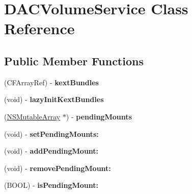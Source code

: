 \hypertarget{interface_d_a_c_volume_service}{
\section{DACVolumeService Class Reference}
\label{interface_d_a_c_volume_service}
}
\subsection*{Public Member Functions}
\begin{DoxyCompactItemize}
\item 
\hypertarget{interface_d_a_c_volume_service_a90c16f857d23a4e89590e1b48929b55a}{
(CFArrayRef) -\/ {\bfseries kextBundles}}
\label{interface_d_a_c_volume_service_a90c16f857d23a4e89590e1b48929b55a}

\item 
\hypertarget{interface_d_a_c_volume_service_a2e31884ac7e2302fac4dfb655878bfc6}{
(void) -\/ {\bfseries lazyInitKextBundles}}
\label{interface_d_a_c_volume_service_a2e31884ac7e2302fac4dfb655878bfc6}

\item 
\hypertarget{interface_d_a_c_volume_service_abfdb85744191af445d18776a903f1bf7}{
(\hyperlink{class_n_s_mutable_array}{NSMutableArray} $\ast$) -\/ {\bfseries pendingMounts}}
\label{interface_d_a_c_volume_service_abfdb85744191af445d18776a903f1bf7}

\item 
\hypertarget{interface_d_a_c_volume_service_afeeae2fef2a8ccc6931faca6456ddd1c}{
(void) -\/ {\bfseries setPendingMounts:}}
\label{interface_d_a_c_volume_service_afeeae2fef2a8ccc6931faca6456ddd1c}

\item 
\hypertarget{interface_d_a_c_volume_service_af78fa3c95399e755aeea138635c9e9fe}{
(void) -\/ {\bfseries addPendingMount:}}
\label{interface_d_a_c_volume_service_af78fa3c95399e755aeea138635c9e9fe}

\item 
\hypertarget{interface_d_a_c_volume_service_af64c6637a2bc3111aa1d50dbe0b23b56}{
(void) -\/ {\bfseries removePendingMount:}}
\label{interface_d_a_c_volume_service_af64c6637a2bc3111aa1d50dbe0b23b56}

\item 
\hypertarget{interface_d_a_c_volume_service_a9902597ef5ad44fc05813f1f568521bb}{
(BOOL) -\/ {\bfseries isPendingMount:}}
\label{interface_d_a_c_volume_service_a9902597ef5ad44fc05813f1f568521bb}


\end{DoxyCompactItemize}
